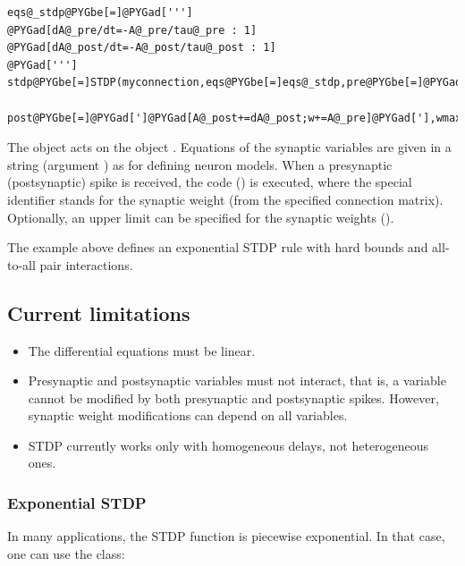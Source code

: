 \documentclass[letterpaper,10pt,english]{manual}
\begin{document}
\begin{Verbatim}[commandchars=@\[\]]
eqs@_stdp@PYGbe[=]@PYGad[''']
@PYGad[dA@_pre/dt=-A@_pre/tau@_pre : 1]
@PYGad[dA@_post/dt=-A@_post/tau@_post : 1]
@PYGad[''']
stdp@PYGbe[=]STDP(myconnection,eqs@PYGbe[=]eqs@_stdp,pre@PYGbe[=]@PYGad[']@PYGad[A@_pre+=dA@_pre;w+=A@_post]@PYGad['],
          post@PYGbe[=]@PYGad[']@PYGad[A@_post+=dA@_post;w+=A@_pre]@PYGad['],wmax@PYGbe[=]gmax)
\end{Verbatim}

The \hyperlink{brian.STDP}{} object acts on the \hyperlink{brian.Connection}{} object
. Equations of the synaptic variables are given in
a string (argument ) as for defining neuron models.
When a presynaptic (postsynaptic) spike is received, the code
 () is executed, where the special identifier
 stands for the synaptic weight (from the specified
connection matrix). Optionally, an upper limit can be specified
for the synaptic weights ().

The example above defines an exponential STDP rule with hard bounds
and all-to-all pair interactions.


\subsection{Current limitations}
\begin{itemize}
\item {} 
The differential equations must be linear.

\item {} 
Presynaptic and postsynaptic variables must not interact, that is,
a variable cannot be modified by both presynaptic and postsynaptic
spikes. However, synaptic weight modifications can depend on all variables.

\item {} 
STDP currently works only with homogeneous delays, not heterogeneous ones.

\end{itemize}


\subsubsection{Exponential STDP}

In many applications, the STDP function is piecewise exponential.
In that case, one can use the \hyperlink{brian.ExponentialSTDP}{} class:
\end{document}
